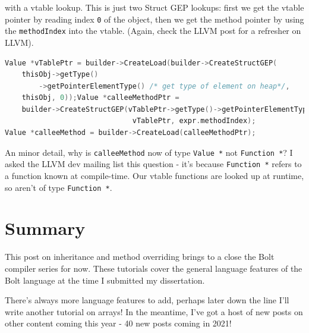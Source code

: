 with a vtable lookup. This is just two Struct GEP lookups: first we get
the vtable pointer by reading index \texttt{0} of the object, then we
get the method pointer by using the \texttt{methodIndex} into the
vtable. (Again, {check
the LLVM post for a refresher on LLVM}).

%

\begin{lstlisting}[caption={expr\_codegen.cc},language=C++]
Value *vTablePtr = builder->CreateLoad(builder->CreateStructGEP(
    thisObj->getType()
        ->getPointerElementType() /* get type of element on heap*/,
    thisObj, 0));Value *calleeMethodPtr =
    builder->CreateStructGEP(vTablePtr->getType()->getPointerElementType(),
                              vTablePtr, expr.methodIndex);
Value *calleeMethod = builder->CreateLoad(calleeMethodPtr);
\end{lstlisting}

An minor detail, why is \texttt{calleeMethod} now of type
\texttt{Value\ *} not \texttt{Function\ *}? I asked the LLVM dev mailing
list this question - it's because \texttt{Function\ *} refers to a
function known at compile-time. Our vtable functions are looked up at
runtime, so aren't of type \texttt{Function\ *}.

\hypertarget{summary}{%
\section{\texorpdfstring{\protect\hyperlink{summary}{}Summary}{Summary}}\label{summary}}

This post on inheritance and method overriding brings to a close the
Bolt compiler series for now. These tutorials cover the general language
features of the Bolt language at the time I submitted my dissertation.

There's always more language features to add, perhaps later down the
line I'll write another tutorial on arrays! In the meantime, I've got a
host of new posts on other content coming this year - 40 new posts
coming in 2021!

%
%
%
%

